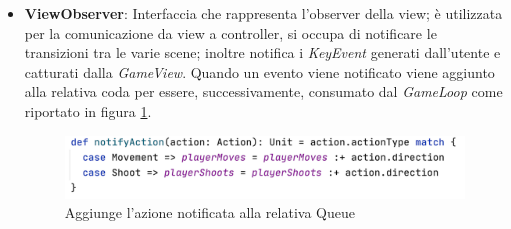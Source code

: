 \begin{itemize}
    \item \textbf{ViewObserver}: Interfaccia che rappresenta l'observer della view; è utilizzata per la comunicazione da view a controller, si occupa di notificare le transizioni tra le varie scene; inoltre notifica i \textit{KeyEvent} generati dall'utente e catturati dalla \textit{GameView}. Quando un evento viene notificato viene aggiunto alla relativa coda per essere, successivamente, consumato dal \textit{GameLoop} come riportato in figura \ref{notifyAction}.
    \begin{figure}[H]
      \includegraphics[width=15cm]{report/res/notifyAction.png}
      \caption{Aggiunge l'azione notificata alla relativa Queue}
      \label{notifyAction}
    \end{figure}
 \end{itemize}
 






